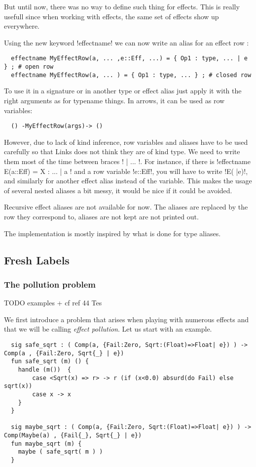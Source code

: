 \documentclass[11pt, nonacm=true, language=french, language=english]{acmart}
\begin{document}
But until now, there was no way to define such thing for effects. This is really usefull since when working with effects, the same set of effects show up everywhere.

Using the new keyword !effectname! we can now write an alias for an effect row :
\begin{lstlisting}
  effectname MyEffectRow(a, ... ,e::Eff, ...) = { Op1 : type, ... | e } ; # open row
  effectname MyEffectRow(a, ... ) = { Op1 : type, ... } ; # closed row
\end{lstlisting}

To use it in a signature or in another type or effect alias just apply it with the right arguments as for typename things. In arrows, it can be used as row variables:
\begin{lstlisting}
  () -MyEffectRow(args)-> ()
\end{lstlisting}

However, due to lack of kind inference, row variables and aliases have to be used carefully so that Links does not think they are of kind type. We need to write them most of the time between braces !{ | ... }!. For instance, if there is !effectname E(a::Eff) = {X : ... | a }! and a row variable !e::Eff!, you will have to write !E({ |e})!, and similarly for another effect alias instead of the variable. This makes the usage of several nested aliases a bit messy, it would be nice if it could be avoided.

Recursive effect aliases are not available for now. The aliases are replaced by the row they correspond to, aliases are not kept are not printed out.

The implementation is mostly inspired by what is done for type aliases.

\subsection{Fresh Labels}
\label{sec:fresh-labels}

\subsubsection{The pollution problem}
\label{sec:pollution-problem}

TODO examples + cf ref 44 Tes

We first introduce a problem that arises when playing with numerous effects and that we will be calling \emph{effect pollution}. Let us start with an example.

\begin{lstlisting}
  sig safe_sqrt : ( Comp(a, {Fail:Zero, Sqrt:(Float)=>Float| e}) ) -> Comp(a , {Fail:Zero, Sqrt{_} | e})
  fun safe_sqrt (m) () {
    handle (m())  {
        case <Sqrt(x) => r> -> r (if (x<0.0) absurd(do Fail) else sqrt(x))
        case x -> x
    }
  }

  sig maybe_sqrt : ( Comp(a, {Fail:Zero, Sqrt:(Float)=>Float| e}) ) -> Comp(Maybe(a) , {Fail{_}, Sqrt{_} | e})
  fun maybe_sqrt (m) {
    maybe ( safe_sqrt( m ) )
  }
\end{lstlisting}
\end{document}
